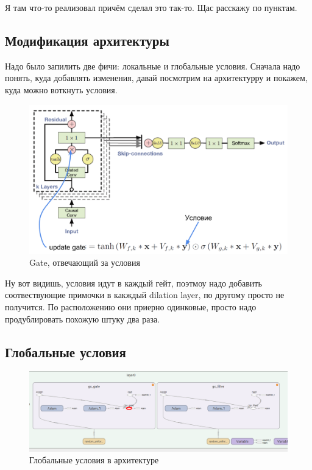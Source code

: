 \documentclass[../diploma.tex]{subfiles}
\begin{document}
 
Я там что-то реализовал причём сделал это так-то. Щас расскажу по пунктам.

\subsection{Модификация архитектуры}
Надо было запилить две фичи: локальные и глобальные условия. 
Сначала надо понять, куда добавлять изменения, давай посмотрим на архитектурру и покажем, куда можно воткнуть условия.


\begin{figure}[ht!]
  \includegraphics[scale=0.35]{img/wavenet_arrow}
  \caption{Gate, отвечающий за условия}
  \label{fig:wavenet_arrow}
\end{figure}

Ну вот видишь, условия идут в каждый гейт, поэтмоу надо добавить соотвествующие примочки в какждый dilation layer, по другому просто не получится.
По расположению они приерно одинковые, просто надо продублировать похожую штуку два раза.

\subsection{Глобальные условия}


\begin{figure}[h!]
  \includegraphics[scale=0.3]{img/gc}
  \caption{Глобальные условия в архитектуре}
  \label{fig:gc}
\end{figure}
\end{document}
